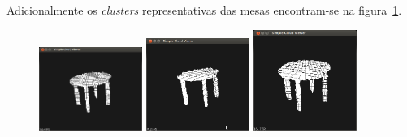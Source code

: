 Adicionalmente os \emph{clusters} representativas das mesas encontram-se na figura~\ref{fig:mesa1_ensaios}.

\begin{figure}[htb]
\begin{center}
	\includegraphics[width=0.30\textwidth]{figures/mesa1_1.png}
	\includegraphics[width=0.30\textwidth]{figures/mesa1_2.png}
	\includegraphics[width=0.30\textwidth]{figures/mesa1_3.png}
	\label{fig:mesa1_ensaios}
\end{center}
\end{figure}


